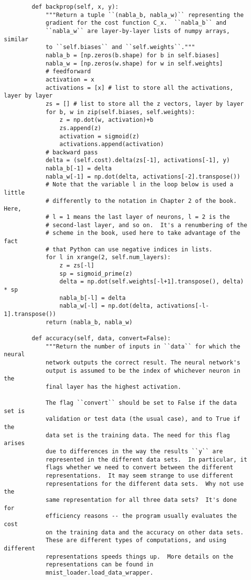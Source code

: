 \begin{lstlisting}
        def backprop(self, x, y):
            """Return a tuple ``(nabla_b, nabla_w)`` representing the
            gradient for the cost function C_x.  ``nabla_b`` and
            ``nabla_w`` are layer-by-layer lists of numpy arrays, similar
            to ``self.biases`` and ``self.weights``."""
            nabla_b = [np.zeros(b.shape) for b in self.biases]
            nabla_w = [np.zeros(w.shape) for w in self.weights]
            # feedforward
            activation = x
            activations = [x] # list to store all the activations, layer by layer
            zs = [] # list to store all the z vectors, layer by layer
            for b, w in zip(self.biases, self.weights):
                z = np.dot(w, activation)+b
                zs.append(z)
                activation = sigmoid(z)
                activations.append(activation)
            # backward pass
            delta = (self.cost).delta(zs[-1], activations[-1], y)
            nabla_b[-1] = delta
            nabla_w[-1] = np.dot(delta, activations[-2].transpose())
            # Note that the variable l in the loop below is used a little
            # differently to the notation in Chapter 2 of the book.  Here,
            # l = 1 means the last layer of neurons, l = 2 is the
            # second-last layer, and so on.  It's a renumbering of the
            # scheme in the book, used here to take advantage of the fact
            # that Python can use negative indices in lists.
            for l in xrange(2, self.num_layers):
                z = zs[-l]
                sp = sigmoid_prime(z)
                delta = np.dot(self.weights[-l+1].transpose(), delta) * sp
                nabla_b[-l] = delta
                nabla_w[-l] = np.dot(delta, activations[-l-1].transpose())
            return (nabla_b, nabla_w)
    
        def accuracy(self, data, convert=False):
            """Return the number of inputs in ``data`` for which the neural
            network outputs the correct result. The neural network's
            output is assumed to be the index of whichever neuron in the
            final layer has the highest activation.
    
            The flag ``convert`` should be set to False if the data set is
            validation or test data (the usual case), and to True if the
            data set is the training data. The need for this flag arises
            due to differences in the way the results ``y`` are
            represented in the different data sets.  In particular, it
            flags whether we need to convert between the different
            representations.  It may seem strange to use different
            representations for the different data sets.  Why not use the
            same representation for all three data sets?  It's done for
            efficiency reasons -- the program usually evaluates the cost
            on the training data and the accuracy on other data sets.
            These are different types of computations, and using different
            representations speeds things up.  More details on the
            representations can be found in
            mnist_loader.load_data_wrapper.
    

\end{lstlisting}
